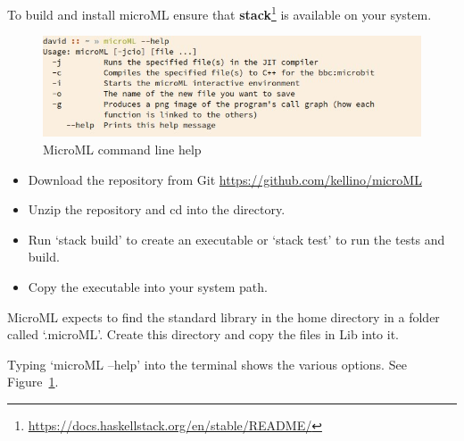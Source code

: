 To build and install microML ensure that
\textbf{stack}\footnote{\url{https://docs.haskellstack.org/en/stable/README/}} is available on your system. 

\begin{figure}
    \label{fig:help}
    \includegraphics[width=\textwidth]{images/help.jpg}
    {\caption{MicroML command line help}}
\end{figure}

\begin{itemize}
    \item Download the repository from Git \url{https://github.com/kellino/microML}
    \item Unzip the repository and cd into the directory.
    \item Run `stack build' to create an executable or `stack test' to run the tests and build.
    \item Copy the executable into your system path.
\end{itemize}

MicroML expects to find the standard library in the home directory in a folder called `.microML'.
Create this directory and copy the files in Lib into it.

Typing `microML --help' into the terminal shows the various options. See Figure~\ref{fig:help}.


